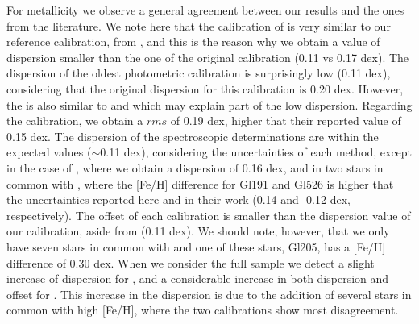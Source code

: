 \documentclass{aa}
\begin{document}
For metallicity we observe a general agreement between our results and the ones from the literature. We note here that the calibration of \citet{Schlaufman-2010} is very similar to our reference calibration, from \citet{Neves-2012}, and this is the reason why we obtain a value of dispersion smaller than the one of the original calibration (0.11 vs 0.17 dex). The dispersion of the oldest photometric calibration \citep{Bonfils-2005} is surprisingly low (0.11 dex), considering that the original dispersion for this calibration is 0.20 dex. However, the \citet{Bonfils-2005} is also similar to \citet{Schlaufman-2010} and \citet{Neves-2012} which may explain part of the low dispersion. Regarding the \citet{Johnson-2012} calibration, we obtain a $rms$ of 0.19 dex, higher that their reported value of 0.15 dex. The dispersion of the spectroscopic determinations are within the expected values ($\sim$0.11 dex), considering the uncertainties of each method, except in the case of \citet{Mann-2013b}, where we obtain a dispersion of 0.16 dex, and in two stars in common with \citet{Woolf-2005}, where the [Fe/H] difference for Gl191 and Gl526 is higher that the uncertainties reported here and in their work (0.14 and -0.12 dex, respectively). The offset of each calibration is smaller than the dispersion value of our calibration, aside from \citet{Mann-2013b} (0.11 dex). We should note, however, that we only have seven stars in common with \citet{Mann-2013b} and one of these stars, Gl205, has a [Fe/H] difference of 0.30 dex. When we consider the full sample we detect a slight increase of dispersion for \citet{Rojas-Ayala-2012}, and a considerable increase in both dispersion and offset for \citet{Newton-2013}. This increase in the \citet{Newton-2013} dispersion is due to the addition of several stars in common with high [Fe/H], where the two calibrations show most disagreement.  %
\end{document}
